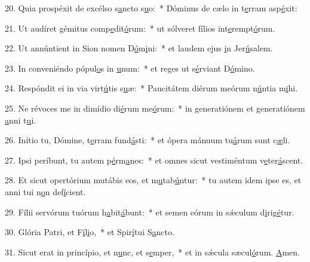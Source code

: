 20. Quia prospéxit de excélso s\uline{a}ncto s\uline{u}o:~* Dóminus de cælo in t\uline{e}rram asp\uline{é}xit:\par 
21. Ut audíret gémitus comp\uline{e}dit\uline{ó}rum:~* ut sólveret fílios int\uline{e}rempt\uline{ó}rum.\par 
22. Ut annúntient in Sion nomen D\uline{ó}m\uline{i}ni:~* et laudem ejus \uline{i}n Jer\uline{ú}salem.\par 
23. In conveniéndo pópul\uline{o}s in \uline{u}num:~* et reges ut s\uline{é}rviant D\uline{ó}mino.\par 
24. Respóndit ei in via virt\uline{ú}tis s\uline{u}æ:~* Paucitátem diérum meórum n\uline{ú}ntia m\uline{i}hi.\par 
25. Ne révoces me in dimídio di\uline{é}rum me\uline{ó}rum:~* in generatiónem et generatiónem \uline{a}nni t\uline{u}i.\par 
26. Inítio tu, Dómine, t\uline{e}rram fund\uline{á}sti:~* et ópera mánuum tu\uline{á}rum sunt c\uline{æ}li.\par 
27. Ipsi períbunt, tu autem p\uline{é}rm\uline{a}nes:~* et omnes sicut vestiméntum v\uline{e}ter\uline{á}scent.\par 
28. Et sicut opertórium mutábis eos, et m\uline{u}tab\uline{ú}ntur:~* tu autem idem ipse es, et anni tui n\uline{o}n def\uline{í}cient.\par 
29. Fílii servórum tuórum h\uline{a}bit\uline{á}bunt:~* et semen eórum in sǽculum d\uline{i}rig\uline{é}tur.\par 
30. Glória Patri, et F\uline{í}l\uline{i}o,~* et Spir\uline{í}tui S\uline{a}ncto.\par 
31. Sicut erat in princípio, et n\uline{u}nc, et s\uline{e}mper,~* et in sǽcula sæcul\uline{ó}rum. \uline{A}men.\par 
